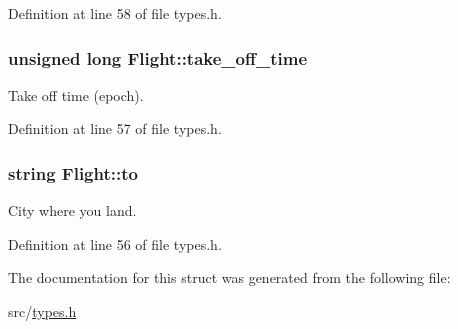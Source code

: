 Definition at line 58 of file types.\-h.

\hypertarget{struct_flight_ab5b6f34a342282ce5821c5490a0294c2}{
\subsubsection[{take\-\_\-off\-\_\-time}]{\setlength{\rightskip}{0pt plus 5cm}unsigned long Flight\-::take\-\_\-off\-\_\-time}}\label{struct_flight_ab5b6f34a342282ce5821c5490a0294c2}
Take off time (epoch). 

Definition at line 57 of file types.\-h.

\hypertarget{struct_flight_a77340455d173748e164aafdcd00c5638}{
\subsubsection[{to}]{\setlength{\rightskip}{0pt plus 5cm}string Flight\-::to}}\label{struct_flight_a77340455d173748e164aafdcd00c5638}
City where you land. 

Definition at line 56 of file types.\-h.



The documentation for this struct was generated from the following file\-:\begin{DoxyCompactItemize}
\item 
src/\hyperlink{types_8h}{types.\-h}\end{DoxyCompactItemize}
